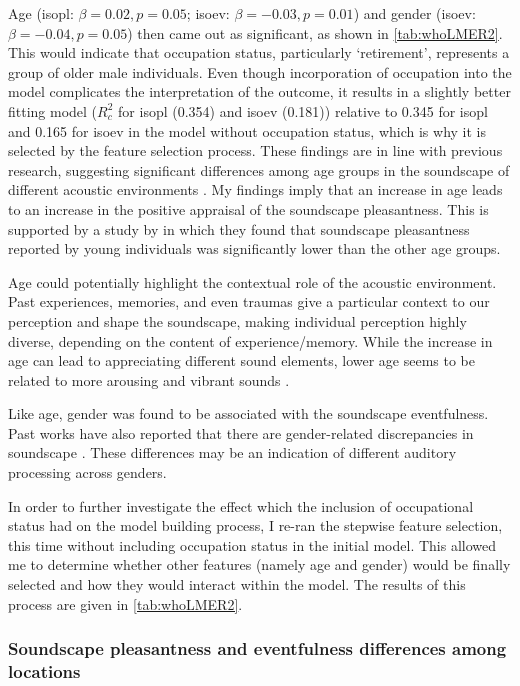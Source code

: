 Age (\gls{isopl}: $\beta=0.02, p=0.05$; \gls{isoev}: $\beta=-0.03, p=0.01$) and gender (\gls{isoev}: $\beta=-0.04, p=0.05$) then came out as significant, as shown in \cref{tab:whoLMER2}. This would indicate that occupation status, particularly `retirement', represents a group of older male individuals. Even though incorporation of occupation into the model complicates the interpretation of the outcome, it results in a slightly better fitting model ($R^2_c$ for \gls{isopl} (0.354) and \gls{isoev} (0.181)) relative to 0.345 for \gls{isopl} and 0.165 for \gls{isoev} in the model without occupation status, which is why it is selected by the feature selection process. These findings are in line with previous research, suggesting significant differences among age groups in the soundscape of different acoustic environments \citep{Ren2016Soundscape,Yang2005Acoustic}. My findings imply that an increase in age leads to an increase in the positive appraisal of the soundscape pleasantness. This is supported by a study by \citet{Aydin2016Assessment} in which they found that soundscape pleasantness reported by young individuals was significantly lower than the other age groups.

Age could potentially highlight the contextual role of the acoustic environment. Past experiences, memories, and even traumas give a particular context to our perception and shape the soundscape, making individual perception highly diverse, depending on the content of experience/memory. While the increase in age can lead to appreciating different sound elements, lower age seems to be related to more arousing and vibrant sounds \citep{Yang2005Acoustic}.

Like age, gender was found to be associated with the soundscape eventfulness. Past works have also reported that there are gender-related discrepancies in soundscape \citep{Croome1977Noise,Yang2005Acoustic}. These differences may be an indication of different auditory processing across genders.

In order to further investigate the effect which the inclusion of occupational status had on the model building process, I re-ran the stepwise feature selection, this time without including occupation status in the initial model. This allowed me to determine whether other features (namely age and gender) would be finally selected and how they would interact within the model. The results of this process are given in \cref{tab:whoLMER2}.


\subsubsection*{Soundscape pleasantness and eventfulness differences among locations}

